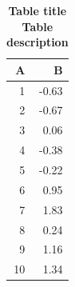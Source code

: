 \begin{table}[ht]
\centering
\begin{tabular}{rr}
  \hline
A & B \\ 
  \hline
  1 & -0.63 \\ 
    2 & -0.67 \\ 
    3 & 0.06 \\ 
    4 & -0.38 \\ 
    5 & -0.22 \\ 
    6 & 0.95 \\ 
    7 & 1.83 \\ 
    8 & 0.24 \\ 
    9 & 1.16 \\ 
   10 & 1.34 \\ 
   \hline
\end{tabular}
\caption{\bf{ Table title } Table description} 
\label{tab:rtab1}
\end{table}

